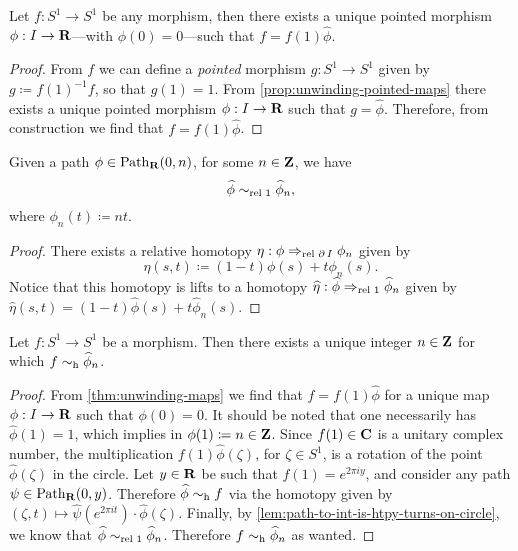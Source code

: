 \begin{theorem}
\label{thm:unwinding-maps}
Let \(f: S^1 \to S^1\) be any morphism, then there exists a unique pointed
morphism \(\phi: I \to \mathbf{R}\)---with \(\phi(0) = 0\)---such that
\(f = f(1) \widehat \phi\).
\end{theorem}

\begin{proof}
From \(f\) we can define a \emph{pointed} morphism \(g: S^1 \to S^1\) given by
\(g \coloneq f(1)^{-1} f\), so that \(g(1) = 1\). From
\cref{prop:unwinding-pointed-maps} there exists a unique pointed morphism
\(\phi: I \to \mathbf{R}\) such that \(g = \widehat \phi\). Therefore, from construction
we find that \(f = f(1) \widehat \phi\).
\end{proof}

\begin{lemma}
\label{lem:path-to-int-is-htpy-turns-on-circle}
Given a path \(\phi \in \operatorname{Path}_{\mathbf{R}}(0, n)\), for some \(n \in \mathbf{Z}\), we have
\[
\widehat \phi \sim_{\text{rel }{1}} \widehat \phi_n,
\]
where \(\phi_n(t) \coloneq n t\).
\end{lemma}

\begin{proof}
There exists a relative homotopy \(\eta: \phi \Rightarrow_{\text{rel }{\operatorname{\partial}I}} \phi_n\) given by
\[
\eta(s, t) \coloneq (1 - t) \phi(s) + t \phi_n(s).
\]
Notice that this homotopy is lifts to a homotopy
\(\widehat \eta: \widehat \phi \Rightarrow_{\text{rel }{1}} \widehat \phi_n\) given by
\(\widehat\eta(s, t) = (1 - t) \widehat \phi(s) + t \widehat \phi_n(s)\).
\end{proof}

\begin{proposition}
\label{prop:circle-morphism-is-winding}
Let \(f: S^1 \to S^1\) be a morphism. Then there exists a unique integer
\(n \in \mathbf{Z}\) for which \(f \sim_{\text{h}} \widehat \phi_n\).
\end{proposition}

\begin{proof}
From \cref{thm:unwinding-maps} we find that \(f = f(1) \widehat \phi\) for a
unique map \(\phi: I \to \mathbf{R}\) such that \(\phi(0) = 0\). It should be noted that
one necessarily has \(\widehat \phi(1) = 1\), which implies in
\(\phi(1) \coloneq n \in \mathbf{Z}\).  Since \(f(1) \in \mathbf{C}\) is a unitary complex
number, the multiplication \(f(1) \widehat \phi(\zeta)\), for \(\zeta \in S^1\),
is a rotation of the point \(\widehat \phi(\zeta)\) in the circle. Let
\(y \in \mathbf{R}\) be such that \(f(1) = e^{2 \pi i y}\), and consider any path
\(\psi \in \operatorname{Path}_{\mathbf{R}}(0, y)\). Therefore \(\widehat \phi \sim_{\text{h}} f\) via the
homotopy given by
\((\zeta, t) \mapsto \widehat \psi(e^{2 \pi i t}) \cdot \widehat \phi(\zeta)\).
Finally, by \cref{lem:path-to-int-is-htpy-turns-on-circle}, we know that
\(\widehat \phi \sim_{\text{rel }{1}} \widehat \phi_n\). Therefore
\(f \sim_{\text{h}} \widehat \phi_n\) as wanted.
\end{proof}

